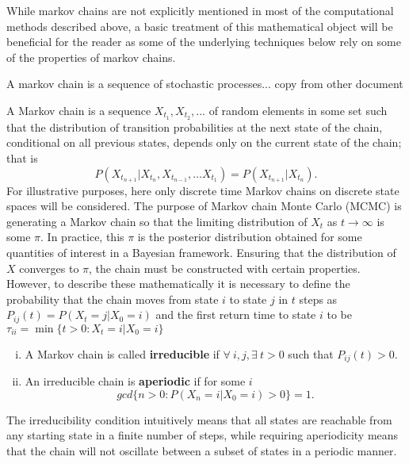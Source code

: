 While markov chains are not explicitly mentioned in most of the computational methods described above, a basic treatment of this mathematical object will be beneficial for the reader as some of the underlying techniques below rely on some of the properties of markov chains.

A markov chain is a sequence of stochastic processes... copy from other document

A Markov chain is a sequence $X_{t_1}, X_{t_2}, ...$ of random elements in some set such that the distribution of transition probabilities at the next state of the chain, conditional on all previous states, depends only on the current state of the chain; that is 
    \begin{equation}
        P(X_{t_{n+1}}|X_{t_n},X_{t_{n-1}},\ldots X_{t_1}) = P(X_{t_{n+1}}|X_{t_n}).
    \end{equation}
For illustrative purposes, here only discrete time Markov chains on discrete state spaces will be considered. 
The purpose of Markov chain Monte Carlo (MCMC) is generating a Markov chain so that the limiting distribution of $X_t$ as $t\rightarrow\infty$ is some $\pi$. 
In practice, this $\pi$ is the posterior distribution obtained for some quantities of interest in a Bayesian framework. 
Ensuring that the distribution of $X$ converges to $\pi$, the chain must be constructed with certain properties. However, to describe these mathematically it is necessary to define the probability that the chain moves from state $i$ to state $j$ in $t$ steps as $ P_{ij}(t) = P(X_t = j | X_0 = i)$
and the first return time to state $i$ to be $\tau_{ii} = \min\{t>0:X_t = i|X_0 = i\}$
    \begin{enumerate}[(i)]
        \item A Markov chain is called \textbf{irreducible} if $\forall~i,j, \exists~t > 0$ such that $P_{ij}(t) > 0$.
        \item An irreducible chain is \textbf{aperiodic} if for some $i$
            $$gcd\{n>0:P(X_n = i|X_0 = i) > 0\} =1. $$
    \end{enumerate}
The irreducibility condition intuitively means that all states are reachable from any starting state in a finite number of steps, while requiring aperiodicity means that the chain will not oscillate between a subset of states in a periodic manner. 